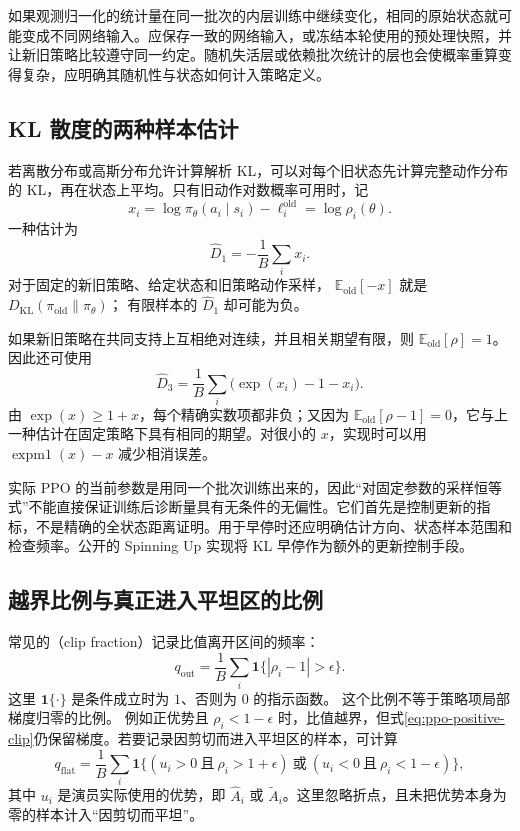 \documentclass[UTF8]{ctexart}
\begin{document}
如果观测归一化的统计量在同一批次的内层训练中继续变化，相同的原始状态就可能变成不同网络输入。应保存一致的网络输入，或冻结本轮使用的预处理快照，并让新旧策略比较遵守同一约定。随机失活层或依赖批次统计的层也会使概率重算变得复杂，应明确其随机性与状态如何计入策略定义。

\subsection{KL 散度的两种样本估计}

若离散分布或高斯分布允许计算解析 KL，可以对每个旧状态先计算完整动作分布的 KL，再在状态上平均。只有旧动作对数概率可用时，记
\[
  x_i=\log\pi_\theta(a_i\mid s_i)-\ell_i^{\mathrm{old}}
      =\log\rho_i(\theta).
\]
一种估计为
\begin{equation}
  \widehat D_1=-\frac1B\sum_i x_i.
  \label{eq:ppo-kl-log}
\end{equation}
对于固定的新旧策略、给定状态和旧策略动作采样，
$\mathbb E_{\mathrm{old}}[-x]$ 就是
$D_{\mathrm{KL}}(\pi_{\mathrm{old}}\|\pi_\theta)$；
有限样本的 $\widehat D_1$ 却可能为负。

如果新旧策略在共同支持上互相绝对连续，并且相关期望有限，则
$\mathbb E_{\mathrm{old}}[\rho]=1$。因此还可使用
\begin{equation}
  \widehat D_3
  =\frac1B\sum_i\bigl(\exp(x_i)-1-x_i\bigr).
  \label{eq:ppo-kl-nonnegative}
\end{equation}
由 $\exp(x)\ge1+x$，每个精确实数项都非负；又因为
$\mathbb E_{\mathrm{old}}[\rho-1]=0$，它与上一种估计在固定策略下具有相同的期望。对很小的 $x$，实现时可以用
$\operatorname{expm1}(x)-x$ 减少相消误差。

实际 PPO 的当前参数是用同一个批次训练出来的，因此“对固定参数的采样恒等式”不能直接保证训练后诊断量具有无条件的无偏性。它们首先是控制更新的指标，不是精确的全状态距离证明。用于早停时还应明确估计方向、状态样本范围和检查频率。公开的 Spinning Up 实现将 KL 早停作为额外的更新控制手段\cite{spinningup-ppo}。

\subsection{越界比例与真正进入平坦区的比例}

常见的（clip fraction）记录比值离开区间的频率：
\begin{equation}
  q_{\mathrm{out}}
  =\frac1B\sum_i
  \mathbf 1\{|\rho_i-1|>\epsilon\}.
  \label{eq:ppo-clip-fraction}
\end{equation}
这里 $\mathbf 1\{\cdot\}$ 是条件成立时为 $1$、否则为 $0$ 的指示函数。
这个比例不等于策略项局部梯度归零的比例。
例如正优势且 $\rho_i<1-\epsilon$ 时，比值越界，但式\eqref{eq:ppo-positive-clip}仍保留梯度。若要记录因剪切而进入平坦区的样本，可计算
\[
  q_{\mathrm{flat}}
  =\frac1B\sum_i
  \mathbf 1\{
    (u_i>0\ \text{且}\ \rho_i>1+\epsilon)
    \ \text{或}\
    (u_i<0\ \text{且}\ \rho_i<1-\epsilon)
  \},
\]
其中 $u_i$ 是演员实际使用的优势，即 $\widehat A_i$ 或
$\widetilde A_i$。这里忽略折点，且未把优势本身为零的样本计入“因剪切而平坦”。
\end{document}
